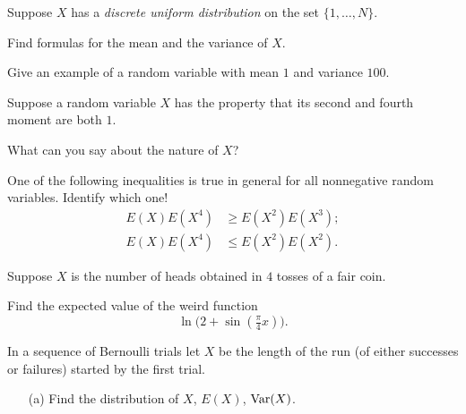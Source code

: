\begin{problem}[Handout 7, \# 10]
  Suppose \(X\) has a \emph{discrete uniform distribution} on the set
  \(\{1,\dotsc,N\}\).

  \noindent Find formulas for the mean and the variance of \(X\).
\end{problem}
\begin{solution*}
\end{solution*}

\begin{problem}
  Give an example of a random variable with mean \(1\) and variance
  \(100\).
\end{problem}
\begin{solution*}
\end{solution*}

\begin{problem}
  Suppose a random variable \(X\) has the property that its second and
  fourth moment are both \(1\).

  \noindent What can you say about the nature of \(X\)?
\end{problem}
\begin{solution*}
\end{solution*}
\newpage

\begin{problem}
  One of the following inequalities is true in general for all nonnegative
  random variables. Identify which one!
  \begin{align*}
    E(X)E(X^4)&\geq E(X^2)E(X^3);\\
    E(X)E(X^4)&\leq E(X^2)E(X^2).
  \end{align*}
\end{problem}
\begin{solution*}
\end{solution*}

\begin{problem}[Handout 7, \# 15]
  Suppose \(X\) is the number of heads obtained in \(4\) tosses of a fair
  coin.

  Find the expected value of the weird function
  \[
    \ln\bigl( 2+\sin(\tfrac{\pi}{4}x) \bigr).
  \]
\end{problem}
\begin{solution*}
\end{solution*}

\begin{problem}[Handout 7, \# 16]
  In a sequence of Bernoulli trials let \(X\) be the length of the run (of
  either successes or failures) started by the first trial.
  \begin{itemize}[noitemsep]
  \item[(a)] Find the distribution of \(X\), \(E(X)\), \(\operatorname{Var}(X)\).
  \end{itemize}
\end{problem}
\begin{solution*}
\end{solution*}

